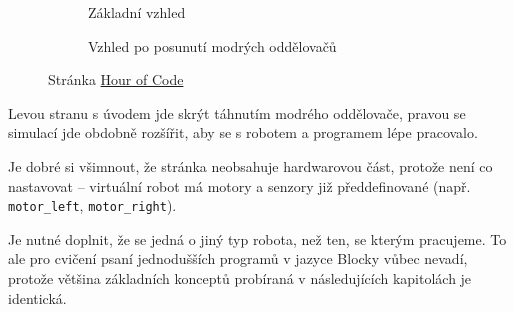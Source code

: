 \documentclass[../main.tex]{subfiles}
\begin{document}
	\begin{figure}[h!]%
		\begin{subfigure}{.49\textwidth}%
			\centering%
			\caption{Základní vzhled}%
		\end{subfigure} \hspace{.05\textwidth}%
		\begin{subfigure}{.49\textwidth}%
			\centering%
			\caption{Vzhled po posunutí modrých oddělovačů}%
		\end{subfigure}%
		\caption{Stránka \href{http://www.robotmesh.com/create/176384}{Hour of Code}}
	\end{figure}

	Levou stranu s úvodem jde skrýt táhnutím modrého oddělovače, pravou se simulací jde obdobně rozšířit, aby se s robotem a programem lépe pracovalo.

	Je dobré si všimnout, že stránka neobsahuje hardwarovou část, protože není co nastavovat -- virtuální robot má motory a senzory již předdefinované (např. \texttt{motor\_left}, \texttt{motor\_right}).

	Je nutné doplnit, že se jedná o jiný typ robota, než ten, se kterým pracujeme. To ale pro cvičení psaní jednodušších programů v jazyce Blocky vůbec nevadí, protože většina základních konceptů probíraná v následujících kapitolách je identická.
\end{document}
